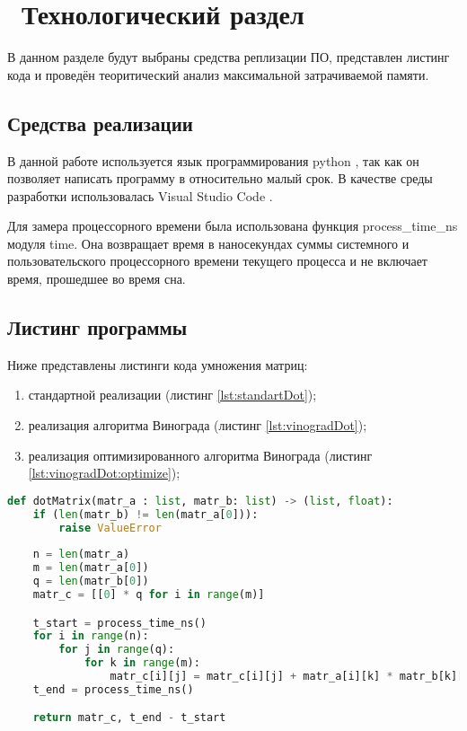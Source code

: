\chapter{ Технологический раздел}
\label{cha:technological}

    В данном разделе будут выбраны средства реплизации ПО, представлен листинг кода
    и проведён теоритический анализ максимальной затрачиваемой памяти. 

    \section{Средства реализации}
        В данной работе используется язык программирования python \cite{python}, так как
        он позволяет написать программу в относительно малый срок.
        В качестве среды разработки использовалась Visual Studio Code \cite{visual-studio-code}.

        Для замера процессорного времени была использована функция process\_time\_ns \cite{process_time} модуля time.
        Она возвращает время в наносекундах суммы системного и пользовательского процессорного времени текущего процесса и 
        не включает время, прошедшее во время сна.

    \section{Листинг программы}
        Ниже представлены листинги кода умножения матриц:
        \begin{enumerate}
            \item стандартной реализации (листинг \ref{lst:standartDot});
            \item реализация алгоритма Винограда (листинг \ref{lst:vinogradDot});
            \item реализация оптимизированного алгоритма Винограда (листинг \ref{lst:vinogradDot:optimize});
        \end{enumerate}
        
        \begin{lstlisting}[language=python, label=lst:standartDot, caption=Реализация классического алгоритма умножения матриц]
def dotMatrix(matr_a : list, matr_b: list) -> (list, float):
    if (len(matr_b) != len(matr_a[0])):
        raise ValueError
    
    n = len(matr_a)
    m = len(matr_a[0])
    q = len(matr_b[0])
    matr_c = [[0] * q for i in range(m)]

    t_start = process_time_ns()
    for i in range(n):
        for j in range(q):
            for k in range(m):
                matr_c[i][j] = matr_c[i][j] + matr_a[i][k] * matr_b[k][j]
    t_end = process_time_ns()

    return matr_c, t_end - t_start
        \end{lstlisting}


